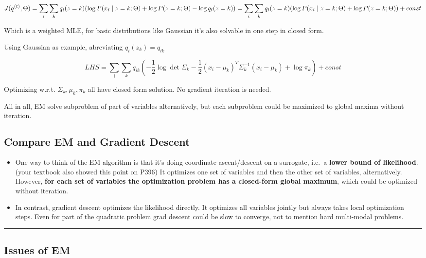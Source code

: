 \documentclass[
]{article}
\providecommand{\tightlist}{%
  \setlength{\itemsep}{0pt}\setlength{\parskip}{0pt}}
\begin{document}
\[
J(q^{(t)},\Theta)\\
=\sum_i \sum_k q_i(z=k) (\log P(x_i\mid z=k;\Theta)+\log P(z=k;\Theta)-\log q_i(z=k))\\
=\sum_i \sum_k q_i(z=k) (\log P(x_i\mid z=k;\Theta)+\log P(z=k;\Theta))+const 
\]

Which is a weighted MLE, for basic distributions like Gaussian it's also
solvable in one step in closed form.

Using Gaussian as example, abreviating \(q_i(z_k)=q_{ik}\)

\[
LHS=\sum_i \sum_k q_{ik}(-\frac 12\log \det\Sigma_k  -\frac 12(x_i-\mu_k)^T\Sigma_k^{-1}(x_i-\mu_k) + \log \pi_k)+const
\]

Optimizing w.r.t. \(\Sigma_k,\mu_k,\pi_k\) all have closed form
solution. No gradient iteration is needed.

All in all, EM solve subproblem of part of variables alternatively, but
each subproblem could be maximized to global maxima without iteration.

\subsection{Compare EM and Gradient Descent}

\begin{itemize}
\tightlist
\item
  One way to think of the EM algorithm is that it's doing coordinate
  ascent/descent on a surrogate, i.e.~a \textbf{lower bound of
  likelihood}. (your textbook also showed this point on P396) It
  optimizes one set of variables and then the other set of variables,
  alternatively. However, \textbf{for each set of variables the
  optimization problem has a closed-form global maximum}, which could be
  optimized without iteration.
\item
  In contrast, gradient descent optimizes the likelihood directly. It
  optimizes all variables jointly but always takes local optimization
  steps. Even for part of the quadratic problem grad descent could be
  slow to converge, not to mention hard multi-modal problems.
\end{itemize}

\begin{center}\rule{0.5\linewidth}{0.5pt}\end{center}

\subsection{Issues of EM}
\end{document}
